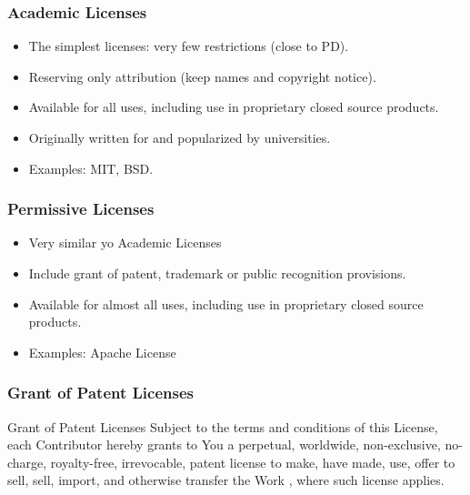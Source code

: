 
\begin{frame}
\frametitle{Academic Licenses}

\begin{itemize}
\item The simplest licenses: very few restrictions (close to PD).
\item Reserving only attribution (keep names and copyright notice).
\item Available for all uses, including use in proprietary closed source products.
\item Originally written for and popularized by universities.
\item Examples: MIT, BSD.
\end{itemize}

\end{frame}


\begin{frame}
\frametitle{Permissive Licenses}

\begin{itemize}
\item Very similar yo Academic Licenses
\item Include grant of patent, trademark or public recognition provisions.
\item Available for almost all uses, including use in proprietary closed source products.
\item Examples: Apache License 
\end{itemize}

\end{frame}


\begin{frame}
\frametitle{Grant of Patent Licenses}

\begin{block}{Grant of Patent Licenses}
Subject to the terms and conditions of this License, each Contributor hereby grants to You a perpetual, worldwide, non-exclusive, no-charge, royalty-free, irrevocable, patent license to make, have made, use, offer to sell, sell, import, and otherwise transfer the Work , where such license applies.
\end{block}

\end{frame}

